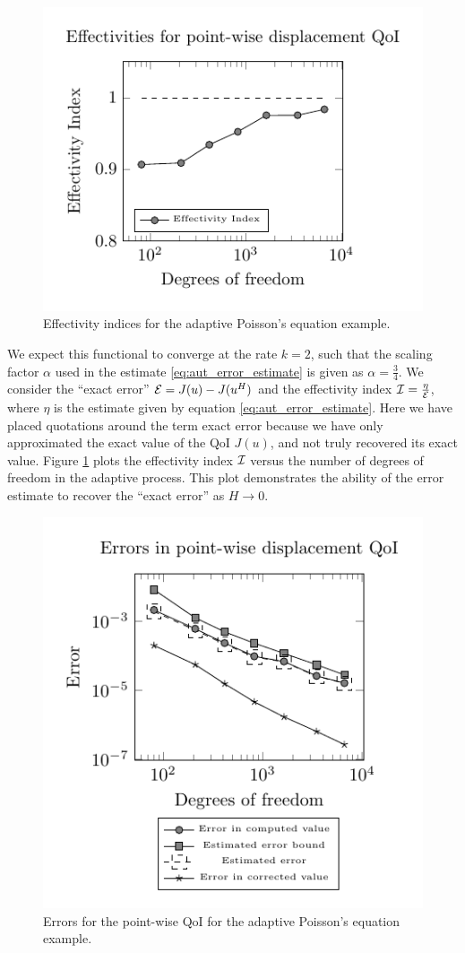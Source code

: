 %
\begin{figure}[ht!]
\centering
\includegraphics[width=.5\textwidth]{img/aut_squarehole_effectivity.pdf}
\caption{Effectivity indices for the adaptive Poisson's equation example.}
\label{fig:aut_squarehole_effectivity}
\end{figure}

We expect this functional to converge
at the rate $k=2$, such that the scaling factor $\alpha$ used in
the estimate \eqref{eq:aut_error_estimate} is given as
$\alpha = \frac34$. We consider the ``exact error''
$\mathcal{E} = J(u) - J(u^H)$ and the effectivity index
$\mathcal{I} = \frac{\eta}{\mathcal{E}}$, where $\eta$ is the estimate given by
equation \eqref{eq:aut_error_estimate}. Here we have placed quotations
around the term exact error because we have only approximated the
exact value of the QoI $J(u)$, and not truly recovered its exact value.
Figure \ref{fig:aut_squarehole_effectivity} plots the effectivity index
$\mathcal{I}$ versus the number of degrees of freedom in the adaptive
process. This plot demonstrates the ability of the error
estimate to recover the ``exact error'' as $H \to 0$.

%
\begin{figure}[ht!]
\centering
\includegraphics[width=.5\textwidth]{img/aut_squarehole_error.pdf}
\caption{Errors for the point-wise QoI for the adaptive Poisson's equation
example.}
\label{fig:aut_squarehole_error}
\end{figure}

